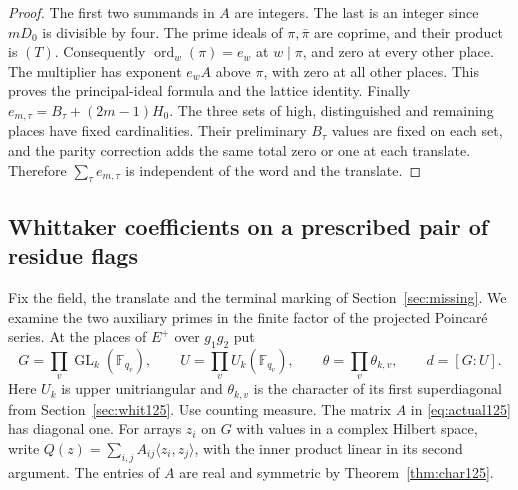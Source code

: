 \documentclass[a4paper,11pt]{article}
\theoremstyle{definition}
\theoremstyle{remark}
\numberwithin{equation}{section}
\newcommand{\GL}{\operatorname{GL}}
\begin{document}
\begin{proof}
The first two summands in \(A\) are integers. The last is an
integer since \(mD_0\) is divisible by four. The prime ideals
of \(\pi,\bar\pi\) are coprime, and their product is \((T)\).
Consequently \(\operatorname{ord}_w(\pi)=e_w\) at \(w\mid\pi\),
and zero at every other place. The multiplier has exponent
\(e_w A\) above \(\pi\), with zero at all other places. This
proves the principal-ideal formula and the lattice identity.
Finally \(e_{m,\tau}=B_\tau+(2m-1)H_0\). The three sets of
high, distinguished and remaining places have fixed
cardinalities. Their preliminary \(B_\tau\) values are fixed
on each set, and the parity correction adds the same total
zero or one at each translate. Therefore \(\sum_\tau e_{m,\tau}\)
is independent of the word and the translate.
\end{proof}



\subsection{Whittaker coefficients on a prescribed pair of residue flags}
\label{sec:flagwhittaker526}

Fix the field, the translate and the terminal marking of
Section~\ref{sec:missing}. We examine the two auxiliary primes
in the finite factor of the projected Poincar\'e series.
At the places of \(E^+\) over \(g_1g_2\) put
\[
 G=\prod_v\GL_k(\mathbb F_{q_v}),\qquad U=\prod_v U_k(\mathbb F_{q_v}),
 \qquad \theta=\prod_v\theta_{k,v},\qquad d=[G:U].
\]
Here \(U_k\) is upper unitriangular and \(\theta_{k,v}\) is the
character of its first superdiagonal from Section~\ref{sec:whit125}.
Use counting measure. The matrix \(A\) in
\eqref{eq:actual125} has diagonal one. For arrays \(z_i\) on
\(G\) with values in a complex Hilbert space, write
\(Q(z)=\sum_{i,j}A_{ij}\langle z_i,z_j\rangle\), with the inner
product linear in its second argument. The entries of \(A\) are
real and symmetric by Theorem~\ref{thm:char125}.
\end{document}
